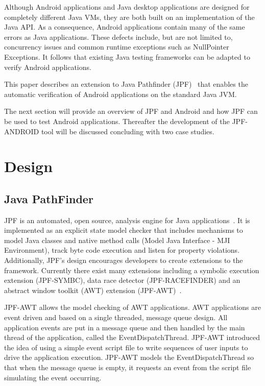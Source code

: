 \documentclass{acm_proc_article-sp}
\begin{document}
Although Android applications and Java desktop applications are designed for completely different Java VMs, they are both built on an
implementation of the Java API. As a consequence, Android applications contain many of the same errors as Java applications. These defects
include, but are not limited to, concurrency issues and common runtime exceptions such as NullPointer Exceptions. It follows that existing
Java testing frameworks can be adapted to verify Android applications.

This paper describes an extension to Java Pathfinder (JPF)~\cite{JPFDocs} that enables the automatic verification of Android applications on
the standard Java JVM. 

The next section will provide an overview of JPF and Android and how JPF can be used to test Android applications. Thereafter
the development of the JPF-ANDROID tool will be discussed concluding with two case studies.

\section{Design}
\subsection{Java PathFinder}
JPF is an automated, open source, analysis engine for Java applications~\cite{JPFDocs}. It is implemented as an explicit state model checker
that includes mechanisms to model Java classes and native method calls (Model Java Interface - MJI Environment), track byte code execution
and listen for property violations. Additionally, JPF's design encourages developers to create extensions to the framework. Currently there
exist many extensions including a symbolic execution extension (JPF-SYMBC), data race
detector (JPF-RACEFINDER) and an abstract window toolkit (AWT) extension (JPF-AWT)~\cite{JPF-AWT}.

JPF-AWT allows the model checking of AWT applications. AWT applications are event driven and based on a single
threaded, message queue design. All application events are put in a message queue and then handled by the main thread of the application,
called the EventDispatchThread. JPF-AWT introduced the idea of using a simple event script file to write sequences of user inputs to drive
the application execution. JPF-AWT models the EventDispatchThread so that when the message queue is empty, it requests an event from the
script file simulating the event occurring. 
\end{document}
